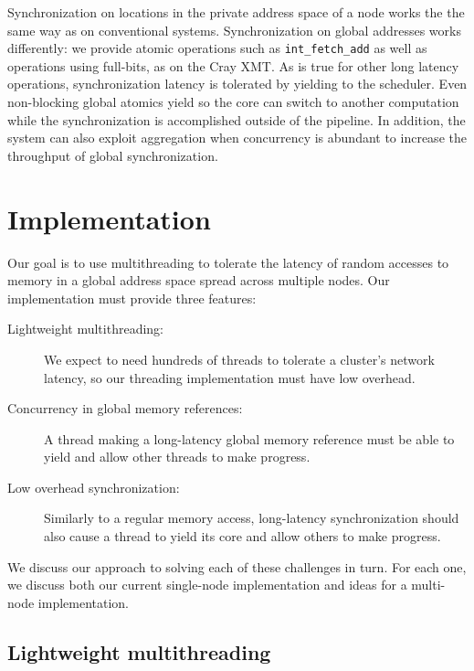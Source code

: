 \documentclass[10pt,nocopyrightspace,preprint]{sigplanconf}
\begin{document}

Synchronization on locations in the private address space of a node
works the the same way as on conventional systems.  Synchronization on
global addresses works differently: we provide atomic operations such
as {\tt int\_fetch\_add} as well as operations using full-bits, as on
the Cray XMT.  As is true for other long latency operations,
synchronization latency is tolerated by yielding to the scheduler.
Even non-blocking global atomics yield so the core can switch to
another computation while the synchronization is accomplished outside
of the pipeline.  In addition, the system can also exploit aggregation
when concurrency is abundant to increase the throughput of global
synchronization.

\section{Implementation}
\label{sec:approach}
Our goal is to use multithreading to tolerate
the latency of random accesses to memory in a global address space
spread across multiple nodes.  Our implementation must provide three features:
\begin{description}
\item[Lightweight multithreading:] We expect to need hundreds of
  threads to tolerate a cluster's network latency, so our threading
  implementation must have low overhead.

\item[Concurrency in global memory references:] A thread making a
  long-latency global memory reference must be able to yield and allow
  other threads to make progress.

\item[Low overhead synchronization:] 
  Similarly to a regular memory access, long-latency synchronization
  should also cause a thread to yield its core  and allow others to make
  progress. %
\end{description}
We discuss our approach to solving each of these challenges in
turn. For each one, we discuss both our current single-node
implementation and ideas for a multi-node implementation.

\subsection{Lightweight multithreading}
\end{document}
